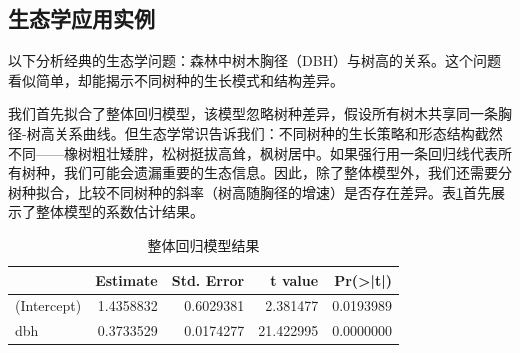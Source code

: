 \documentclass[
  twoside,12pt,fontset=none]{ctexbook}
\newenvironment{Shaded}{\begin{snugshade}}{\end{snugshade}}
\newcommand{\AttributeTok}[1]{\textcolor[rgb]{0.13,0.29,0.53}{#1}}
\newcommand{\CommentTok}[1]{\textcolor[rgb]{0.56,0.35,0.01}{\textit{#1}}}
\newcommand{\FunctionTok}[1]{\textcolor[rgb]{0.13,0.29,0.53}{\textbf{#1}}}
\newcommand{\NormalTok}[1]{#1}
\newcommand{\OtherTok}[1]{\textcolor[rgb]{0.56,0.35,0.01}{#1}}
\newcommand{\SpecialCharTok}[1]{\textcolor[rgb]{0.81,0.36,0.00}{\textbf{#1}}}
\newcommand{\StringTok}[1]{\textcolor[rgb]{0.31,0.60,0.02}{#1}}
\begin{document}
\hypertarget{ux751fux6001ux5b66ux5e94ux7528ux5b9eux4f8b-1}{%
\subsection{生态学应用实例}\label{ux751fux6001ux5b66ux5e94ux7528ux5b9eux4f8b-1}}

以下分析经典的生态学问题：森林中树木胸径（DBH）与树高的关系。这个问题看似简单，却能揭示不同树种的生长模式和结构差异。

\begin{Shaded}
\end{Shaded}

我们首先拟合了整体回归模型，该模型忽略树种差异，假设所有树木共享同一条胸径-树高关系曲线。但生态学常识告诉我们：不同树种的生长策略和形态结构截然不同------橡树粗壮矮胖，松树挺拔高耸，枫树居中。如果强行用一条回归线代表所有树种，我们可能会遗漏重要的生态信息。因此，除了整体模型外，我们还需要分树种拟合，比较不同树种的斜率（树高随胸径的增速）是否存在差异。表\ref{tab:overall-model-coefficients}首先展示了整体模型的系数估计结果。

\begin{table}[!h]
\centering
\caption{\label{tab:overall-model-coefficients}整体回归模型结果}
\centering
\begin{tabular}[t]{lrrrr}
\toprule
  & Estimate & Std. Error & t value & Pr(>|t|)\\
\midrule
(Intercept) & 1.4358832 & 0.6029381 & 2.381477 & 0.0193989\\
dbh & 0.3733529 & 0.0174277 & 21.422995 & 0.0000000\\
\bottomrule
\end{tabular}
\end{table}
\end{document}
